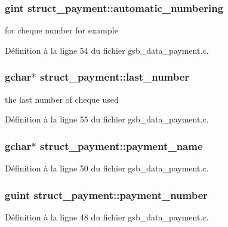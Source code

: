 \subsubsection[{automatic\_\-numbering}]{\setlength{\rightskip}{0pt plus 5cm}gint {\bf struct\_\-payment::automatic\_\-numbering}}\label{structstruct__payment_a4622b266940998a8539d8512ad665493}
for cheque number for example 

Définition à la ligne 54 du fichier gsb\_\-data\_\-payment.c.

\subsubsection[{last\_\-number}]{\setlength{\rightskip}{0pt plus 5cm}gchar$\ast$ {\bf struct\_\-payment::last\_\-number}}\label{structstruct__payment_aeea1e86cb61bd8b1bd0bdb7b380b127c}
the last number of cheque used 

Définition à la ligne 55 du fichier gsb\_\-data\_\-payment.c.

\subsubsection[{payment\_\-name}]{\setlength{\rightskip}{0pt plus 5cm}gchar$\ast$ {\bf struct\_\-payment::payment\_\-name}}\label{structstruct__payment_a4e120a0cd71d7a4a2e0112e327e9281d}


Définition à la ligne 50 du fichier gsb\_\-data\_\-payment.c.

\subsubsection[{payment\_\-number}]{\setlength{\rightskip}{0pt plus 5cm}guint {\bf struct\_\-payment::payment\_\-number}}\label{structstruct__payment_a4b166b942e6175ef944c91f196baca33}


Définition à la ligne 48 du fichier gsb\_\-data\_\-payment.c.

